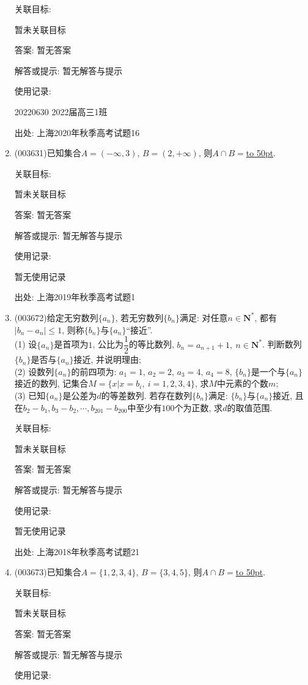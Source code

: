 \documentclass[10pt,a4paper]{article}
\newcommand{\blank}[1]{\underline{\hbox to #1pt{}}}
\begin{document}
\begin{enumerate}[1.]
关联目标:

暂未关联目标

答案: 暂无答案

解答或提示: 暂无解答与提示

使用记录:

20220630	2022届高三1班	


出处: 上海2020年秋季高考试题16
\item { (003631)}已知集合$A=(-\infty,3)$, $B=(2,+\infty)$, 则$A\cap B=$\blank{50}.


关联目标:

暂未关联目标

答案: 暂无答案

解答或提示: 暂无解答与提示

使用记录:

暂无使用记录


出处: 上海2019年秋季高考试题1
\item { (003672)}给定无穷数列$\{a_n\}$, 若无穷数列$\{b_n\}$满足: 对任意$n\in \mathbf{N}^*$, 都有$|b_n-a_n|\le 1$, 则称$\{b_n\}$与$\{a_n\}$``接近''.\\
(1) 设$\{a_n\}$是首项为$1$, 公比为$\dfrac{1}{2}$的等比数列, $b_n=a_{n+1}+1, \ n\in \mathbf{N}^*$. 判断数列$\{b_n\}$是否与$\{a_n\}$接近, 并说明理由;\\
(2) 设数列$\{a_n\}$的前四项为: $a_1=1$, $a_2=2$, $a_3=4$, $a_4=8$, $\{b_n\}$是一个与$\{a_n\}$接近的数列, 记集合$M=\{x|x=b_i, \ i=1,2,3,4\}$, 求$M$中元素的个数$m$;\\
(3) 已知$\{a_n\}$是公差为$d$的等差数列. 若存在数列$\{b_n\}$满足: $\{b_n\}$与$\{a_n\}$接近, 且在$b_2-b_1,b_3-b_2,\cdots,b_{201}-b_{200}$中至少有$100$个为正数, 求$d$的取值范围.


关联目标:

暂未关联目标

答案: 暂无答案

解答或提示: 暂无解答与提示

使用记录:

暂无使用记录


出处: 上海2018年秋季高考试题21
\item { (003673)}已知集合$A=\{1,2,3,4\}$, $B=\{3,4,5\}$, 则$A\cap B=$\blank{50}.


关联目标:

暂未关联目标

答案: 暂无答案

解答或提示: 暂无解答与提示

使用记录:


\end{enumerate}
\end{document}
